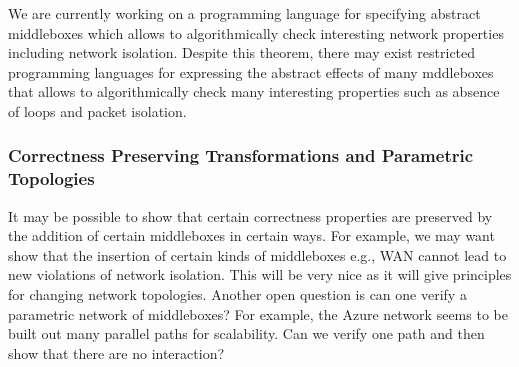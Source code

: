 We are currently working on a programming language for specifying abstract middleboxes which allows to algorithmically check
interesting network properties including network isolation.
Despite this theorem, there may exist restricted programming languages for expressing the abstract effects of many mddleboxes that allows to algorithmically check many interesting
properties such as absence of loops and packet isolation.

\subsubsection{Correctness Preserving Transformations and Parametric Topologies}
It may be possible to show that certain correctness properties are preserved by the addition of certain middleboxes in certain ways.
For example, we may want show that the insertion of certain kinds of middleboxes e.g., WAN cannot lead to new violations of network isolation.
This will be very nice as it will give principles for changing network topologies.
Another open question is can one verify a parametric network of middleboxes?
For example, the Azure network seems to be built out many parallel paths for scalability.
Can we verify one path and then show that there are no interaction?
